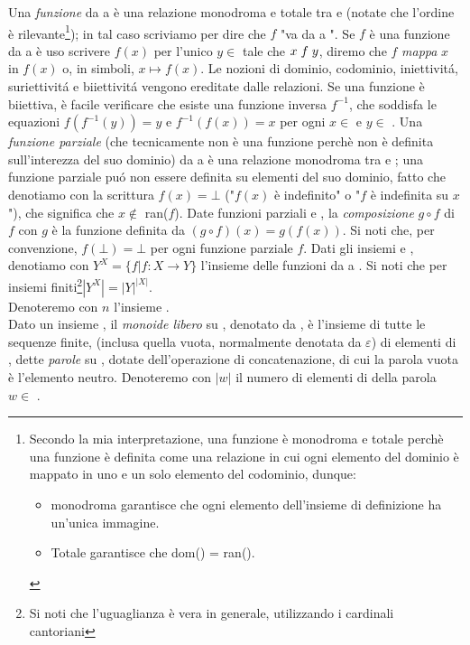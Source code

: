 Una \textit{funzione} da  a  è una relazione monodroma e totale tra  e  (notate che l'ordine è rilevante\footnote{Secondo la mia interpretazione, una funzione è monodroma e totale perchè una funzione è definita come una relazione in cui ogni elemento del dominio è mappato in uno e un solo elemento del codominio, dunque:
\begin{itemize}
    \item monodroma garantisce che ogni elemento dell'insieme di definizione ha un'unica immagine.
    \item Totale garantisce che dom() = ran().
\end{itemize}}); in tal caso scriviamo  per dire che $f$ "va da  a ". Se $f$ è una funzione da  a  è uso scrivere $f(x)$ per l'unico $y \in$  tale che $x \hspace{1mm} f \hspace{1mm} y$, diremo che $f$ \textit{mappa} $x$ in $f(x)$ o, in simboli, $x \mapsto f(x)$. Le nozioni di dominio, codominio, iniettivitá, suriettivitá e biiettivitá vengono ereditate dalle relazioni. Se una funzione  è biiettiva, è facile verificare che esiste una funzione inversa $f^{-1}$, che soddisfa le equazioni $f(f^{-1}(y)) = y$ e $f^{-1}(f(x)) = x$ per ogni $x \in$  e $y \in$ . Una \textit{funzione parziale} (che tecnicamente non è una funzione perchè non è definita sull'interezza del suo dominio) da  a  è una relazione monodroma tra  e ; una funzione parziale puó non essere definita su elementi del suo dominio, fatto che denotiamo con la scrittura $f(x) = \bot$ ("$f(x)$ è indefinito" o "$f$ è indefinita su $x$"), che significa che $x \notin$ ran($f$). Date funzioni parziali  e , la \textit{composizione} $g \circ f$ di $f$ con $g$ è la funzione definita da $(g \circ f)(x) = g(f(x))$. Si noti che, per convenzione, $f(\bot) = \bot$ per ogni funzione parziale $f$. Dati gli insiemi  e , denotiamo con $Y^X = \{f | f : X \rightarrow Y\}$ l'insieme delle funzioni da  a . Si noti che per insiemi finiti\footnote{Si noti che l'uguaglianza è vera in generale, utilizzando i cardinali cantoriani}$|Y^X| = |Y|^{|X|}$.\\
Denoteremo con $n$ l'insieme .\\
Dato un insieme , il \textit{monoide libero} su , denotato da , è l'insieme di tutte le sequenze finite, (inclusa quella vuota, normalmente denotata da $\varepsilon$) di elementi di , dette \textit{parole} su , dotate dell'operazione di concatenazione, di cui la parola vuota è l'elemento neutro. Denoteremo con $|w|$ il numero di elementi di  della parola $w \in$ .
